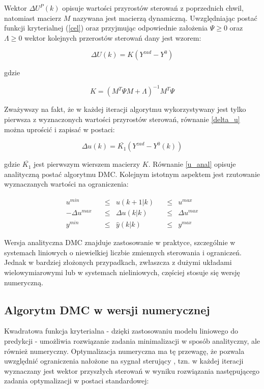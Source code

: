 \noindent Wektor $\Delta U^P(k)$ opisuje wartości przyrostów sterowań z poprzednich chwil, natomiast macierz $M$ nazywana jest macierzą dynamiczną. Uwzględniając postać funkcji kryterialnej (\ref{cel}) oraz przyjmując odpowiednie założenia $\Psi \geq 0$ oraz $\Lambda \geq 0$ wektor kolejnych przerostów sterowań dany jest wzorem:

\begin{equation}
\Delta U(k) = K(Y^{zad} - Y^0)
\label{delta_u}
\end{equation}

\noindent gdzie

\begin{equation}
K = (M^T \Psi M  + \Lambda)^{-1} M^T \Psi
\end{equation}

\noindent Zważywszy na fakt, że w każdej iteracji algorytmu wykorzystywany jest tylko pierwsza z wyznaczonych wartości przyrostów sterowań, równanie \ref{delta_u} można uprościć i zapisać w postaci:

\begin{equation}
\Delta u(k) = \bar{K_1} (Y^{zad} - Y^0(k))
\label{u_anal}
\end{equation}

\noindent gdzie $\bar{K_1}$ jest pierwszym wierszem macierzy $K$. Równanie \ref{u_anal} opisuje analityczną postać algorytmu DMC. Kolejnym istotnym aspektem jest rzutowanie wyznaczanych wartości na ograniczenia:

\begin{equation}
\begin{aligned}
u^{min} \quad &\leq& u(k+1|k) \quad &\leq& u^{max} \\
-\Delta u^{max} \quad &\leq& \Delta u(k|k) \quad &\leq& \Delta u^{max} \\
y^{min} \quad &\leq& \hat{y}(k|k) \quad &\leq& y^{max}
\end{aligned}
\end{equation}

Wersja analityczna DMC znajduje zastosowanie w praktyce, szczególnie w systemach liniowych o niewielkiej liczbie zmiennych sterowania i ograniczeń. Jednak w bardziej złożonych przypadkach, zwłaszcza z dużymi układami wielowymiarowymi lub w systemach nieliniowych, częściej stosuje się wersję numeryczną.

\subsection{Algorytm DMC w wersji numerycznej}
Kwadratowa funkcja kryterialna - dzięki zastosowaniu modelu liniowego do predykcji - umożliwia rozwiązanie zadania minimalizacji w sposób analityczny, ale również numeryczny. Optymalizacja numeryczna ma tę przewagę, że pozwala uwzględnić ograniczenia nałożone na sygnał sterujący \cite{160}, tzn. w każdej iteracji wyznaczany jest wektor przyszłych sterowań w wyniku rozwiązania następującego zadania optymalizacji w postaci standardowej:

